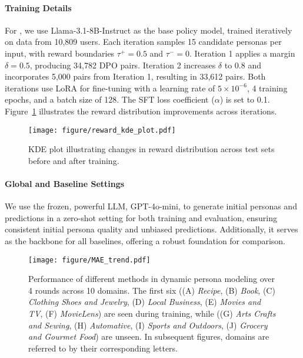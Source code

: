 \paragraph{\method Training Details}  
For \method, we use Llama-3.1-8B-Instruct\cite{ llama3modelcard} as the base policy model, trained iteratively on data from 10,809 users. Each iteration samples 15 candidate personas per input, with reward boundaries $\tau^+ = 0.5$ and $\tau^- = 0$. Iteration 1 applies a margin $\delta = 0.5$, producing 34,782 DPO pairs. Iteration 2 increases $\delta$ to 0.8 and incorporates 5,000 pairs from Iteration 1, resulting in 33,612 pairs. Both iterations use LoRA for fine-tuning with a learning rate of $5 \times 10^{-6}$, 4 training epochs, and a batch size of 128. The SFT loss coefficient ($\alpha$) is set to 0.1. Figure~\ref{fig:reward_kde} illustrates the reward distribution improvements across iterations.

\begin{figure}[t]
    \centering    
    \texttt{[image: figure/reward\_kde\_plot.pdf]}
    \caption{KDE plot illustrating changes in reward distribution across test sets before and after training.}
    \label{fig:reward_kde}
\end{figure}

\paragraph{Global and Baseline Settings}

We use the frozen, powerful LLM, GPT-4o-mini\cite{achiam2023gpt}, to generate initial personas and predictions in a zero-shot setting for both training and evaluation, ensuring consistent initial persona quality and unbiased predictions. Additionally, it serves as the backbone for all baselines, offering a robust foundation for comparison.


\begin{figure*}[t]
    \centering
    \texttt{[image: figure/MAE\_trend.pdf]}
    \caption{Performance of different methods in dynamic persona modeling over 4 rounds across 10 domains. The first six ((A) \textit{Recipe}, (B) \textit{Book}, (C) \textit{Clothing Shoes and Jewelry}, (D) \textit{Local Business}, (E) \textit{Movies and TV}, (F) \textit{MovieLens}) are seen during training, while ((G) \textit{Arts Crafts and Sewing}, (H) \textit{Automative}, (I) \textit{Sports and Outdoors}, (J) \textit{Grocery and Gourmet Food}) are unseen. In subsequent figures, domains are referred to by their corresponding letters.}
    \label{fig:main_results}
\end{figure*}















